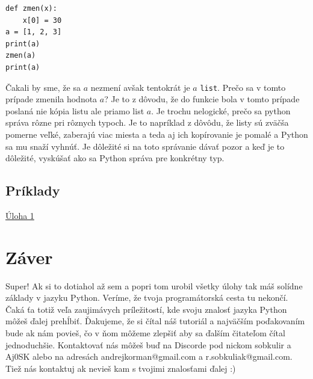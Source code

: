 \documentclass{article}
\begin{document}
\begin{lstlisting}
def zmen(x):
    x[0] = 30
a = [1, 2, 3]
print(a)
zmen(a)
print(a)
\end{lstlisting}

Čakali by sme, že sa $a$ nezmení avšak tentokrát je $a$ \texttt{list}. Prečo sa v tomto prípade zmenila hodnota $a$? Je to z dôvodu, že do funkcie bola v tomto prípade poslaná nie kópia listu ale priamo list $a$. Je trochu nelogické, prečo sa python správa rôzne pri rôznych typoch. Je to napríklad z dôvôdu, že listy sú zväčša pomerne veľké, zaberajú viac miesta a teda aj ich kopírovanie je pomalé a Python sa mu snaží vyhnúť. Je dôležité si na toto správanie dávať pozor a keď je to dôležité, vyskúšať ako sa Python správa pre konkrétny typ.

\subsection{Príklady}
\href{https://testovac.ksp.sk/tasks/ls-uvod-tlacitka/}{Úloha 1}

\section{Záver}

Super! Ak si to dotiahol až sem a popri tom urobil všetky úlohy tak máš solídne základy v jazyku Python. Veríme, že tvoja programátorská cesta tu nekončí. Čaká ťa totiž veľa zaujimávych príležitostí, kde svoju znalosť jazyka Python môžeš ďalej prehĺbiť. Ďakujeme, že si čítal náš tutoriál a najväčším poďakovaním bude ak nám povieš, čo v ňom môžeme zlepšiť aby sa ďalším čitateľom čítal jednoduchšie. Kontaktovať nás môžeš buď na Discorde pod nickom sobkulir a Aj0SK alebo na adresách andrejkorman@gmail.com a r.sobkuliak@gmail.com. Tiež nás kontaktuj ak nevieš kam s tvojimi znalosťami ďalej :)


\end{document}
